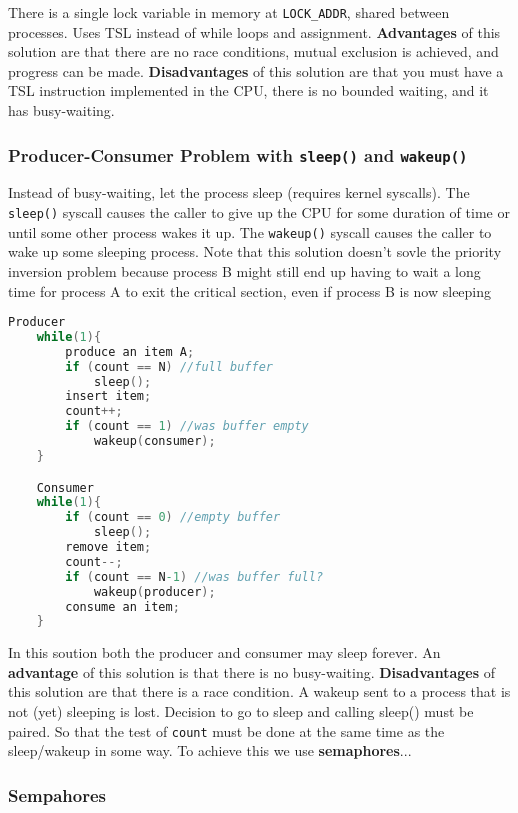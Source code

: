 \documentclass{article}
\newcommand{\bold}[1]{\textbf{#1}}
\begin{document}
    There is a single lock variable in memory at \texttt{LOCK\_ADDR}, shared between processes. Uses TSL instead of while loops and assignment. \bold{Advantages} of this solution are that there are no race conditions, mutual exclusion is achieved, and progress can be made. \bold{Disadvantages} of this solution are that you must have a TSL instruction implemented in the CPU, there is no bounded waiting, and it has busy-waiting. 
        
    \subsubsection{Producer-Consumer Problem with \texttt{sleep()} and \texttt{wakeup()}}

    Instead of busy-waiting, let the process sleep (requires kernel syscalls). The \texttt{sleep()} syscall causes the caller to give up the CPU for some duration of time or until some other process wakes it up. The \texttt{wakeup()} syscall causes the caller to wake up some sleeping process. Note that this solution doesn't sovle the priority inversion problem because process B might still end up having to wait a long time for process A to exit the critical section, even if process B is now sleeping

    \begin{lstlisting}[language=C]
    Producer
    while(1){
        produce an item A;
        if (count == N) //full buffer
            sleep();
        insert item; 
        count++;
        if (count == 1) //was buffer empty
            wakeup(consumer);
    }

    Consumer
    while(1){
        if (count == 0) //empty buffer
            sleep();
        remove item;
        count--;
        if (count == N-1) //was buffer full?
            wakeup(producer);
        consume an item;
    }
    \end{lstlisting}

    \noindent In this soution both the producer and consumer may sleep forever. An \bold{advantage} of this solution is that there is no busy-waiting. \bold{Disadvantages} of this solution are that there is a race condition. A wakeup sent to a process that is not (yet) sleeping is lost. Decision to go to sleep and calling sleep() must be paired. So that the test of \texttt{count} must be done at the same time as the sleep/wakeup in some way. To achieve this we use \bold{semaphores}...

    \subsubsection{Sempahores}
\end{document}
